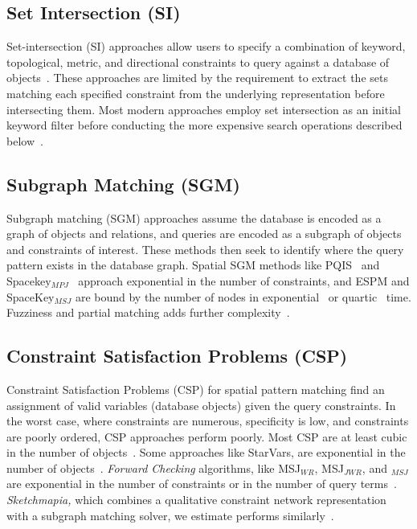 \subsection{Set Intersection (SI)}
\par{  
    Set-intersection (SI) approaches allow users to specify a combination of keyword, topological, metric, and directional constraints to query against a database of objects~\cite{DiLoreto1996, Soffer1996, Soffer1997, Soffer1998a, Soffer1999}.
    These approaches are limited by the requirement to extract the sets matching each specified constraint from the underlying representation before intersecting them. 
    Most modern approaches employ set intersection as an initial keyword filter before conducting the more expensive search operations described below~\cite{Schwering2014, Osul2023}.
    

\subsection{Subgraph Matching (SGM)}
\par{
    Subgraph matching (SGM) approaches assume the database is encoded as a graph of objects and relations, and queries are encoded as a subgraph of objects and constraints of interest.
    These methods then seek to identify where the query pattern exists in the database graph. 
    Spatial SGM methods like PQIS~\cite{Folkers2000} and Spacekey$_{MPJ}$~\cite{Fang2019} approach exponential in the number of constraints, and ESPM and SpaceKey$_{MSJ}$ are bound by the number of nodes in exponential~\cite{Chen2019} or quartic~\cite{Fang2019} time.
    Fuzziness and partial matching adds further complexity~\cite{Fang2019}.
    }
    
\subsection{Constraint Satisfaction Problems (CSP)}
    \par{
    Constraint Satisfaction Problems (CSP) for spatial pattern matching find an assignment of valid variables (database objects) given the query constraints.
    In the worst case, where constraints are numerous, specificity is low, and constraints are poorly ordered, CSP approaches perform poorly.
    Most CSP are at least cubic in the number of objects~\cite{Dylla2017}.
    Some approaches like StarVars, are exponential in the number of objects~\cite{Lee2013}.
    \textit{Forward Checking} algorithms, like MSJ$_{WR}$, MSJ$_{JWR}$, and $_{MSJ}$ are exponential in the number of constraints or in the number of query terms~\cite{Papadias1998}.
    \textit{Sketchmapia,} which combines a qualitative constraint network representation with a subgraph matching solver, we estimate performs similarly~\cite{Schwering2014, Jan2015}.
   

}}
